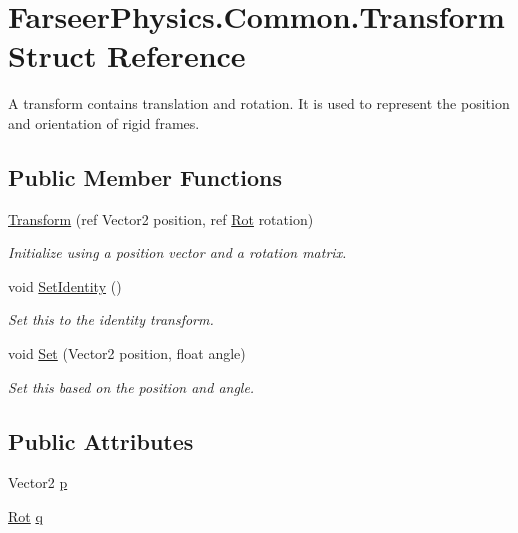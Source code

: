 \hypertarget{struct_farseer_physics_1_1_common_1_1_transform}{\section{Farseer\+Physics.\+Common.\+Transform Struct Reference}
\label{struct_farseer_physics_1_1_common_1_1_transform}
}


A transform contains translation and rotation. It is used to represent the position and orientation of rigid frames.  


\subsection*{Public Member Functions}
\begin{DoxyCompactItemize}
\item 
\hyperlink{struct_farseer_physics_1_1_common_1_1_transform_ad39fef3c729d19a0b36d93b63e438fae}{Transform} (ref Vector2 position, ref \hyperlink{struct_farseer_physics_1_1_common_1_1_rot}{Rot} rotation)
\begin{DoxyCompactList}\small\item\em Initialize using a position vector and a rotation matrix. \end{DoxyCompactList}\item 
void \hyperlink{struct_farseer_physics_1_1_common_1_1_transform_aad7b0f26c204104b2113010aaabf5a9a}{Set\+Identity} ()
\begin{DoxyCompactList}\small\item\em Set this to the identity transform. \end{DoxyCompactList}\item 
void \hyperlink{struct_farseer_physics_1_1_common_1_1_transform_a500a663699d8ae2131373d91f3a10b76}{Set} (Vector2 position, float angle)
\begin{DoxyCompactList}\small\item\em Set this based on the position and angle. \end{DoxyCompactList}\end{DoxyCompactItemize}
\subsection*{Public Attributes}
\begin{DoxyCompactItemize}
\item 
Vector2 \hyperlink{struct_farseer_physics_1_1_common_1_1_transform_aaa3db917aafcf614398e9416f0abd5da}{p}
\item 
\hyperlink{struct_farseer_physics_1_1_common_1_1_rot}{Rot} \hyperlink{struct_farseer_physics_1_1_common_1_1_transform_a79594f7027981624e5f9e7f8c73e403f}{q}
\end{DoxyCompactItemize}


